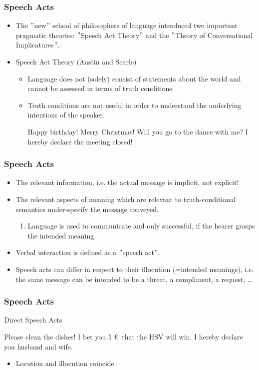 \documentclass[12pt, table]{beamer}
\begin{document}
\begin{frame}
\frametitle{Speech Acts}
\begin{itemize}
\item The $"$new$"$ school of philosophers of language introduced two important pragmatic theories:  $"$Speech Act Theory$"$ and the $"$Theory of Conversational Implicatures$"$.
\item Speech Act Theory (Austin and Searle)
\begin{itemize}
\item Language does not (solely) consist of statements about the world and cannot be assessed in terms of truth conditions. 
\item Truth conditions are not useful in order to understand the underlying intentions of the speaker.
\begin{exe}
\ex Happy birthday!
\ex Merry Christmas!
\ex Will you go to the dance with me? 
\ex I hereby declare the meeting closed!
\end{exe}
\end{itemize}
\end{itemize}
\end{frame}

\begin{frame}
\frametitle{Speech Acts}
\begin{itemize}
\item The relevant information, i.e. the actual message is implicit, not explicit!
\item The relevant aspects of meaning which are relevant to truth-conditional semantics under-specify the message conveyed.
\begin{enumerate}
\item Language is used to communicate and only successful, if the hearer grasps the intended meaning.
\end{enumerate}
\item Verbal interaction is defined as a $"$speech act$"$.
\item Speech acts can differ in respect to their illocution (=intended meanings), i.e. the same message can be intended to be a threat, a compliment, a request, \dots
\end{itemize}
\end{frame}

\begin{frame}
\frametitle{Speech Acts}
Direct Speech Acts
\begin{exe}
\ex Please clean the dishes!
\ex I bet you 5 \euro\ that the HSV will win.
\ex I hereby declare you husband and wife.
\end{exe}
\begin{itemize}
\item Locution and illocution coincide.
\end{itemize}
\end{frame}
\end{document}
